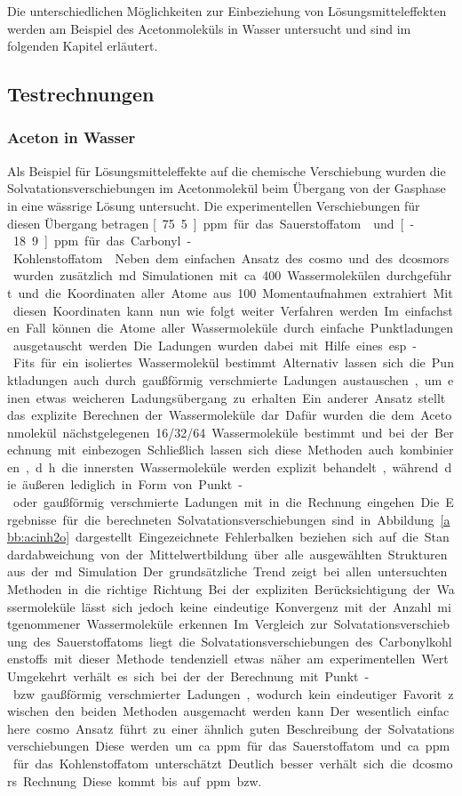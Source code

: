 Die unterschiedlichen Möglichkeiten zur Einbeziehung von Lösungsmitteleffekten werden am Beispiel des Acetonmoleküls in Wasser untersucht und sind im folgenden Kapitel erläutert.
	
	\subsection{Testrechnungen}\label{lömitest}
	\subsubsection{Aceton in Wasser}
	Als Beispiel für Lösungsmitteleffekte auf die chemische Verschiebung wurden die Solvatationsverschiebungen im Acetonmolekül beim Übergang von der Gasphase in eine wässrige Lösung untersucht. Die experimentellen Verschiebungen für diesen Übergang betragen \unit[75.5]{ppm} für das Sauerstoffatom\supercite{cossi2003different} und \unit[-18.9]{ppm} für das Carbonyl-Kohlenstoffatom\supercite{tiffon1978effet}. Neben dem einfachen Ansatz des \ac{cosmo} und des \ac{dcosmors} wurden zusätzlich \ac{md} Simulationen mit ca. 400 Wassermolekülen durchgeführt und die Koordinaten aller Atome aus 100 Momentaufnahmen extrahiert. Mit diesen Koordinaten kann nun wie folgt weiter Verfahren werden. Im einfachsten Fall können die Atome aller Wassermoleküle durch einfache Punktladungen ausgetauscht werden. Die Ladungen wurden dabei mit Hilfe eines \acs{esp}-Fits für ein isoliertes Wassermolekül bestimmt. Alternativ lassen sich die Punktladungen auch durch gaußförmig verschmierte Ladungen austauschen, um einen etwas weicheren Ladungsübergang zu erhalten. Ein anderer Ansatz stellt das explizite Berechnen der Wassermoleküle dar. Dafür wurden die dem Acetonmolekül nächstgelegenen 16/32/64 Wassermoleküle bestimmt und bei der Berechnung mit einbezogen. Schließlich lassen sich diese Methoden auch kombinieren, d.h. die innersten Wassermoleküle werden explizit behandelt, während die äußeren lediglich in Form von Punkt- oder gaußförmig verschmierte Ladungen mit in die Rechnung eingehen. Die Ergebnisse für die berechneten Solvatationsverschiebungen sind in Abbildung \ref{abb:acinh2o} dargestellt. Eingezeichnete Fehlerbalken beziehen sich auf die Standardabweichung von der Mittelwertbildung über alle ausgewählten Strukturen aus der \ac{md} Simulation. Der grundsätzliche Trend zeigt bei allen untersuchten Methoden in die richtige Richtung. Bei der expliziten Berücksichtigung der Wassermoleküle lässt sich jedoch keine eindeutige Konvergenz mit der Anzahl mitgenommener Wassermoleküle erkennen. Im Vergleich zur Solvatationsverschiebung des Sauerstoffatoms liegt die Solvatationsverschiebungen des Carbonylkohlenstoffs mit dieser Methode tendenziell etwas näher am experimentellen Wert. Umgekehrt verhält es sich bei der der Berechnung mit Punkt- bzw. gaußförmig verschmierter Ladungen, wodurch kein eindeutiger Favorit zwischen den beiden Methoden ausgemacht werden kann. Der wesentlich einfachere \ac{cosmo} Ansatz führt zu einer ähnlich guten Beschreibung der Solvatationsverschiebungen. Diese werden um ca. \unit[25]{ppm} für das Sauerstoffatom und ca. \unit[9]{ppm} für das Kohlenstoffatom unterschätzt. Deutlich besser verhält sich die \ac{dcosmors} Rechnung. Diese kommt bis auf \unit[9]{ppm} bzw. 
